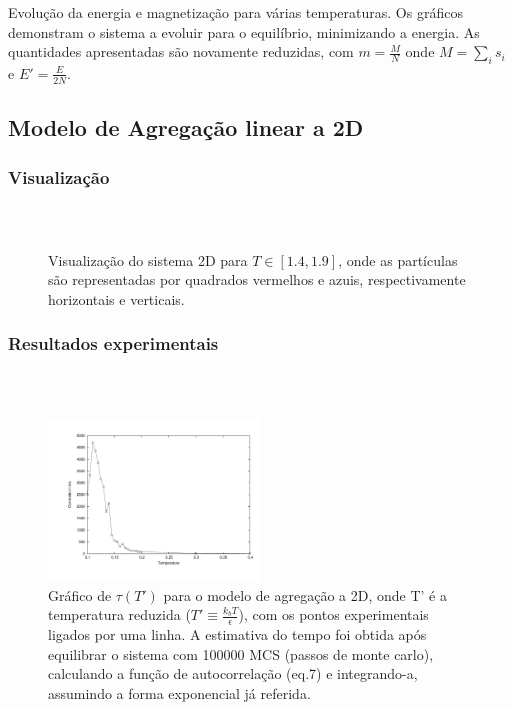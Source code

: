 \documentclass[11pt]{beamer}
\begin{document}
\begin{frame}
{\footnotesize Evolução da energia e magnetização para várias temperaturas. Os gráficos demonstram o sistema a evoluir para o equilíbrio, minimizando a energia. As quantidades apresentadas são novamente reduzidas, com $m =\frac{M}{N}$ onde $M=\sum_i s_i$ e $E'=\frac{E}{2N}$. }

\end{frame}

\subsection{Modelo de Agregação linear a 2D}

\subsubsection{Visualização}

\begin{frame}
\frametitle{\insertsection \\ {\small \insertsubsection}}
\begin{figure}
	\centering
	\caption{{\footnotesize Visualização do sistema 2D para $T \in [1.4,1.9]$, onde as partículas são representadas por quadrados vermelhos e azuis, respectivamente horizontais e verticais.}}     
	\label{fig:2}
\end{figure}
\end{frame}

\subsubsection{Resultados experimentais}

\begin{frame}
\frametitle{\insertsection \\ {\small \insertsubsection}}
\begin{figure}
	\centering
		\includegraphics[width=0.5\textwidth]{images/ctimesr2d}
	\caption{{\footnotesize Gráfico de $\tau(T')$ para o modelo de agregação a 2D, onde T' é a temperatura reduzida ($T'\equiv\frac{k_b T}{\epsilon}$), com os pontos experimentais ligados por uma linha. A estimativa do tempo foi obtida após equilibrar o sistema com 100000 MCS (passos de monte carlo), calculando a função de autocorrelação (eq.7) e integrando-a, assumindo a forma exponencial já referida.}}
	\label{fig:3}
\end{figure}
\end{frame}
\end{document}
